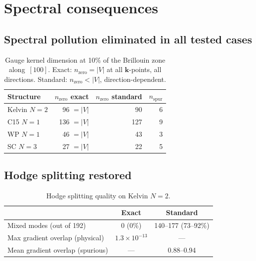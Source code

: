 \documentclass[12pt]{article}
\theoremstyle{definition}
\theoremstyle{remark}
\newcommand{\kk}{\mathbf{k}}
\begin{document}
\section{Spectral consequences}
\label{sec:spectral}

\subsection{Spectral pollution eliminated in all tested cases}

\begin{table}[h]
\centering
\begin{tabular}{lrrr}
\toprule
Structure & $n_{\mathrm{zero}}$ exact & $n_{\mathrm{zero}}$ standard & $n_{\mathrm{spur}}$ \\
\midrule
Kelvin $N{=}2$ & 96 $= |V|$ & 90 & 6 \\
C15 $N{=}1$    & 136 $= |V|$ & 127 & 9 \\
WP $N{=}1$     & 46 $= |V|$ & 43 & 3 \\
SC $N{=}3$     & 27 $= |V|$ & 22 & 5 \\
\bottomrule
\end{tabular}
\caption{Gauge kernel dimension at 10\% of the Brillouin zone along~$[100]$.
Exact: $n_{\mathrm{zero}} = |V|$ at all $\kk$-points, all directions.
Standard: $n_{\mathrm{zero}} < |V|$, direction-dependent.}
\label{tab:kernel}
\end{table}

\subsection{Hodge splitting restored}

\begin{table}[h]
\centering
\begin{tabular}{lcc}
\toprule
& Exact & Standard \\
\midrule
Mixed modes (out of 192) & 0 (0\%) & 140--177 (73--92\%) \\
Max gradient overlap (physical) & $1.3 \times 10^{-13}$ & --- \\
Mean gradient overlap (spurious) & --- & 0.88--0.94 \\
\bottomrule
\end{tabular}
\caption{Hodge splitting quality on Kelvin $N{=}2$.}
\label{tab:hodge}
\end{table}
\end{document}
